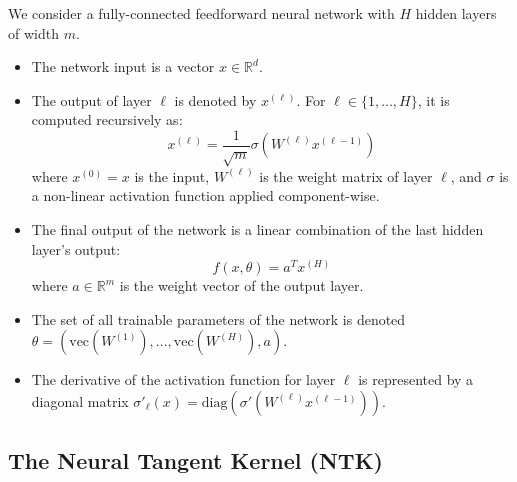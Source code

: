 \documentclass[11pt,a4paper]{article}
\theoremstyle{definition}
\begin{document}
We consider a fully-connected feedforward neural network with $H$ hidden layers of width $m$.
\begin{itemize}
    \item The network input is a vector $x \in \mathbb{R}^d$.
    \item The output of layer $\ell$ is denoted by $x^{(\ell)}$. For $\ell \in \{1, \dots, H\}$, it is computed recursively as:
    \begin{equation}
        x^{(\ell)} = \frac{1}{\sqrt{m}}\sigma(W^{(\ell)}x^{(\ell-1)})
    \end{equation}
    where $x^{(0)} = x$ is the input, $W^{(\ell)}$ is the weight matrix of layer $\ell$, and $\sigma$ is a non-linear activation function applied component-wise.
    \item The final output of the network is a linear combination of the last hidden layer's output:
    \begin{equation}
        f(x, \theta) = a^T x^{(H)}
    \end{equation}
    where $a \in \mathbb{R}^m$ is the weight vector of the output layer.
    \item The set of all trainable parameters of the network is denoted $\theta = (\text{vec}(W^{(1)}), \dots, \text{vec}(W^{(H)}), a)$.
    \item The derivative of the activation function for layer $\ell$ is represented by a diagonal matrix $\sigma'_\ell(x) = \text{diag}(\sigma'(W^{(\ell)}x^{(\ell-1)}))$.
\end{itemize}

\subsection{The Neural Tangent Kernel (NTK)}
\end{document}
